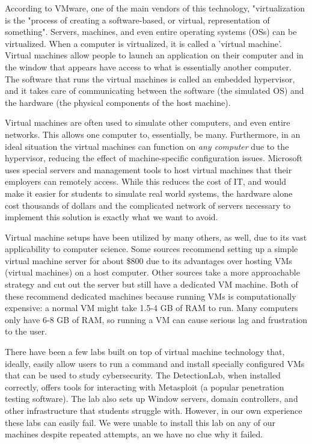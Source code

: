 \documentclass[openright]{report}
\begin{document}
\par According to VMware, one of the main vendors of this technology, "virtualization is the "process of creating a software-based, or virtual, representation of something"\cite{virtualization_def}. Servers, machines, and even entire operating systems (OSs) can be virtualized. When a computer is virtualized, it is called a 'virtual machine'. Virtual machines allow people to launch an application on their computer and in the window that appears have access to what is essentially another computer. The software that runs the virtual machines is called an embedded hypervisor, and it takes care of communicating between the software (the simulated OS) and the hardware (the physical components of the host machine)\cite{virtualization_comparison}.

\par Virtual machines are often used to simulate other computers, and even entire networks. This allows one computer to, essentially, be many. Furthermore, in an ideal situation the virtual machines can function on \textit{any computer} due to the hypervisor, reducing the effect of machine-specific configuration issues. Microsoft uses special servers and management tools to host virtual machines that their employers can remotely access\cite{ms_virtual_setup}. While this reduces the cost of IT, and would make it easier for students to simulate real world systems, the hardware alone cost thousands of dollars and the complicated network of servers necessary to implement this solution is exactly what we want to avoid.

\par Virtual machine setups have been utilized by many others, as well, due to its vast applicability to computer science. Some sources recommend setting up a simple virtual machine server for about \$800 due to its advantages over hosting VMs (virtual machines) on a host computer\cite{virtual_mch_server}. Other sources take a more approachable strategy and cut out the server but still have a dedicated VM machine\cite{simple_virtual}. Both of these recommend dedicated machines because running VMs is computationally expensive: a normal VM might take 1.5-4 GB of RAM to run. Many computers only have 6-8 GB of RAM, so running a VM can cause serious lag and frustration to the user. 

\par There have been a few labs built on top of virtual machine technology that, ideally, easily allow users to run a command and install specially configured VMs that can be used to study cybersecurity. The DetectionLab, when installed correctly, offers tools for interacting with Metasploit (a popular penetration testing software). The lab also sets up Window servers, domain controllers, and other infrastructure that students struggle with\cite{detection_lab}. However, in our own experience these labs can easily fail. We were unable to install this lab on any of our machines despite repeated attempts, an we have no clue why it failed.
\end{document}
